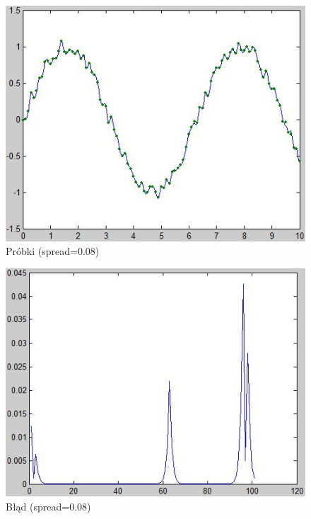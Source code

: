 \begin{figure}[!h]
\centering
\includegraphics[scale=0.8]{src/0_08_wykres.png}\caption{\label{fig:0.08_wykres}Próbki (spread=0.08)}
\end{figure}

\begin{figure}[!h]
\centering
\includegraphics[scale=0.8]{src/0_08_blad.png}\caption{\label{fig:0.08_blad}Błąd (spread=0.08)}
\end{figure}

